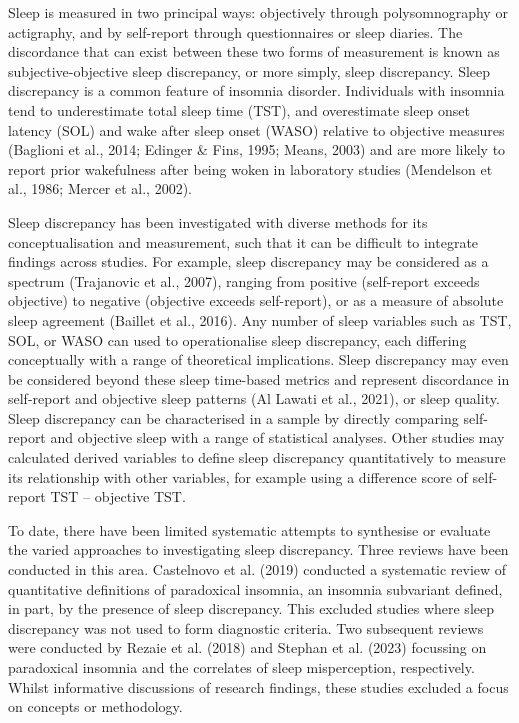 \documentclass[
]{article}
\begin{document}
Sleep is measured in two principal ways: objectively through polysomnography or actigraphy, and by self-report through questionnaires or sleep diaries. The discordance that can exist between these two forms of measurement is known as subjective-objective sleep discrepancy, or more simply, sleep discrepancy. Sleep discrepancy is a common feature of insomnia disorder. Individuals with insomnia tend to underestimate total sleep time (TST), and overestimate sleep onset latency (SOL) and wake after sleep onset (WASO) relative to objective measures (Baglioni et al., 2014; Edinger \& Fins, 1995; Means, 2003) and are more likely to report prior wakefulness after being woken in laboratory studies (Mendelson et al., 1986; Mercer et al., 2002).

Sleep discrepancy has been investigated with diverse methods for its conceptualisation and measurement, such that it can be difficult to integrate findings across studies. For example, sleep discrepancy may be considered as a spectrum (Trajanovic et al., 2007), ranging from positive (self-report exceeds objective) to negative (objective exceeds self-report), or as a measure of absolute sleep agreement (Baillet et al., 2016). Any number of sleep variables such as TST, SOL, or WASO can used to operationalise sleep discrepancy, each differing conceptually with a range of theoretical implications. Sleep discrepancy may even be considered beyond these sleep time-based metrics and represent discordance in self-report and objective sleep patterns (Al Lawati et al., 2021), or sleep quality. Sleep discrepancy can be characterised in a sample by directly comparing self-report and objective sleep with a range of statistical analyses. Other studies may calculated derived variables to define sleep discrepancy quantitatively to measure its relationship with other variables, for example using a difference score of self-report TST -- objective TST.

To date, there have been limited systematic attempts to synthesise or evaluate the varied approaches to investigating sleep discrepancy. Three reviews have been conducted in this area. Castelnovo et al. (2019) conducted a systematic review of quantitative definitions of paradoxical insomnia, an insomnia subvariant defined, in part, by the presence of sleep discrepancy. This excluded studies where sleep discrepancy was not used to form diagnostic criteria. Two subsequent reviews were conducted by Rezaie et al. (2018) and Stephan et al. (2023) focussing on paradoxical insomnia and the correlates of sleep misperception, respectively. Whilst informative discussions of research findings, these studies excluded a focus on concepts or methodology.
\end{document}
